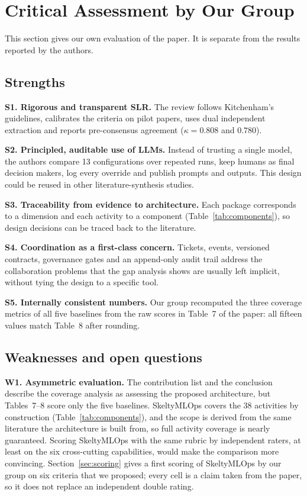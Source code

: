 \documentclass[11pt,a4paper]{article}
\begin{document}
\section{Critical Assessment by Our Group}\label{sec:assessment}

This section gives our own evaluation of the paper. It is separate from the results reported by the authors.

\subsection{Strengths}

\textbf{S1. Rigorous and transparent SLR.} The review follows Kitchenham's guidelines, calibrates the criteria on pilot papers, uses dual independent extraction and reports pre-consensus agreement ($\kappa = 0.808$ and $0.780$).

\textbf{S2. Principled, auditable use of LLMs.} Instead of trusting a single model, the authors compare 13 configurations over repeated runs, keep humans as final decision makers, log every override and publish prompts and outputs. This design could be reused in other literature-synthesis studies.

\textbf{S3. Traceability from evidence to architecture.} Each package corresponds to a dimension and each activity to a component (Table~\ref{tab:components}), so design decisions can be traced back to the literature.

\textbf{S4. Coordination as a first-class concern.} Tickets, events, versioned contracts, governance gates and an append-only audit trail address the collaboration problems that the gap analysis shows are usually left implicit, without tying the design to a specific tool.

\textbf{S5. Internally consistent numbers.} Our group recomputed the three coverage metrics of all five baselines from the raw scores in Table~7 of the paper: all fifteen values match Table~8 after rounding.

\subsection{Weaknesses and open questions}

\textbf{W1. Asymmetric evaluation.} The contribution list and the conclusion describe the coverage analysis as assessing the proposed architecture, but Tables~7--8 score only the five baselines. SkeltyMLOps covers the 38 activities by construction (Table~\ref{tab:components}), and the scope is derived from the same literature the architecture is built from, so full activity coverage is nearly guaranteed. Scoring SkeltyMLOps with the same rubric by independent raters, at least on the six cross-cutting capabilities, would make the comparison more convincing. Section~\ref{sec:scoring} gives a first scoring of SkeltyMLOps by our group on six criteria that we proposed; every cell is a claim taken from the paper, so it does not replace an independent double rating.
\end{document}
